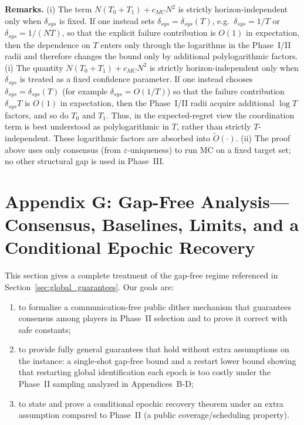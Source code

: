 \medskip

\noindent\textbf{Remarks.}
(i) The term $N(T_0+T_1)+c_{MC}N^2$ is strictly horizon-independent only when $\delta_{sys}$ is fixed. If one instead sets $\delta_{sys}=\delta_{sys}(T)$, e.g.\ $\delta_{sys}=1/T$ or $\delta_{sys}=1/(NT)$, so that the explicit failure contribution is $O(1)$ in expectation, then the dependence on $T$ enters only through the logarithms in the Phase~I/II radii and therefore changes the bound only by additional polylogarithmic factors.
(i) The quantity \(N(T_0+T_1)+c_{MC}N^2\) is strictly horizon-independent only when \(\delta_{sys}\) is treated as a fixed confidence parameter. If one instead chooses \(\delta_{sys}=\delta_{sys}(T)\) (for example \(\delta_{sys}=O(1/T)\)) so that the failure contribution \(\delta_{sys}T\) is \(O(1)\) in expectation, then the Phase~I/II radii acquire additional \(\log T\) factors, and so do \(T_0\) and \(T_1\). Thus, in the expected-regret view the coordination term is best understood as polylogarithmic in \(T\), rather than strictly \(T\)-independent. These logarithmic factors are absorbed into \(\tilde O(\cdot)\).
(ii) The proof above uses only consensus (from $\varepsilon$-uniqueness) to run MC on a fixed target set; no other structural gap is used in Phase~III.








\section*{Appendix G: Gap-Free Analysis—Consensus, Baselines, Limits, and a Conditional Epochic Recovery}
\label{app:gapfree}

This section gives a complete treatment of the gap-free regime referenced in Section~\ref{sec:global_guarantees}. Our goals are:
\begin{enumerate}
\item to formalize a communication-free public dither mechanism that guarantees consensus among players in Phase~II selection and to prove it correct with safe constants;
\item to provide fully general guarantees that hold without extra assumptions on the instance: a single-shot gap-free bound and a restart lower bound showing that restarting global identification each epoch is too costly under the Phase~II sampling analyzed in Appendices~B-D;
\item to state and prove a conditional epochic recovery theorem under an extra assumption compared to Phase~II (a public coverage/scheduling property).
\end{enumerate}

